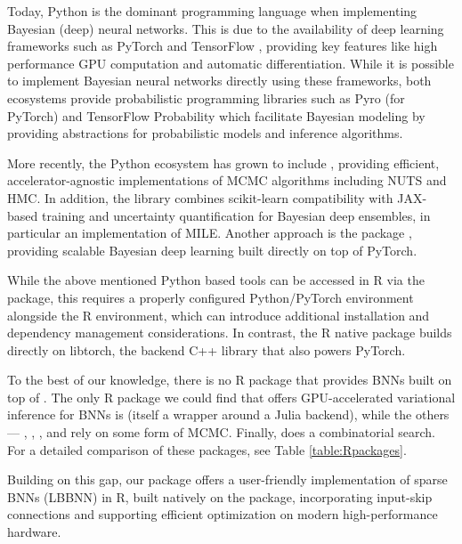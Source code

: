 Today, Python is the dominant programming language when implementing Bayesian (deep) neural networks. This is due to the availability of deep learning frameworks such as PyTorch \citep{paszke2019pytorch} and TensorFlow \citep{tensorflow2015-whitepaper}, providing key features like high performance GPU computation and automatic differentiation. While it is possible to implement Bayesian neural networks directly using these frameworks, both ecosystems provide probabilistic programming libraries such as Pyro \citep{bingham2019pyro} (for PyTorch) and TensorFlow Probability \citep{dillon2017tensorflow} which facilitate Bayesian modeling by providing abstractions for probabilistic models and inference algorithms. 

More recently, the Python ecosystem has grown to include  \citep{cabezas2024blackjax}, providing efficient, accelerator-agnostic implementations of MCMC algorithms including NUTS and HMC. In addition, the  \citep{arvanitis2026bde} library combines scikit-learn compatibility with JAX-based training and uncertainty quantification for Bayesian deep ensembles, in particular an implementation of MILE. Another approach is the  package \citep{duffield2024scalable}, providing scalable Bayesian deep learning built directly on top of PyTorch.

While the above mentioned Python based tools can be accessed in R via the  \citep{reticulate} package, this requires a properly configured Python/PyTorch environment alongside the R environment, which can introduce additional installation and dependency management considerations. In contrast, the R native  \citep{torchR} package builds directly on libtorch, the backend C++ library that also powers PyTorch.

To the best of our knowledge, there is no R package that provides BNNs built on top of . The only R package we could find that offers GPU-accelerated variational inference for BNNs is  \citep{bayesfluxr} (itself a wrapper around a Julia backend), while the others ---  \citep{bnns},  \citep{liang2018bayesian},  \citep{sharaf2020blnn}, and   \citep{boomspikeslab} rely on some form of MCMC. Finally,  \citep{mcinerney2025statistical} does a combinatorial search. For a detailed comparison of these packages, see Table \ref{table:Rpackages}. 

Building on this gap, our  package offers a user-friendly implementation of sparse BNNs (LBBNN) in R, built natively on the  package, incorporating input-skip connections and supporting efficient optimization on modern high-performance hardware.

